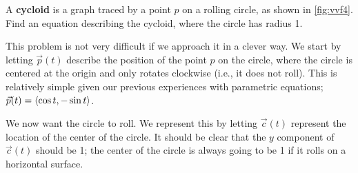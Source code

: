 \begin{example}\label{ex_vvf4}%
A \textbf{cycloid} is a graph traced by a point $p$ on a rolling circle, as shown in \autoref{fig:vvf4}. Find an equation describing the cycloid, where the circle has radius 1.
\begin{center}
\captionsetup{type=figure}
\caption{Tracing a cycloid.}\label{fig:vvf4}\tagstructend
\end{center}
\solution
This problem is not very difficult if we approach it in a clever way. We start by letting $\vec p(t)$ describe the position of the point $p$ on the circle, where the circle is centered at the origin and only rotates clockwise (i.e., it  does not roll). This is relatively simple given our previous experiences with parametric equations; $\vec p(t) =\left\langle \cos t, -\sin t\right\rangle$. 

We now want the circle to roll. We represent this by letting $\vec c(t)$ represent the location of the center of the circle. It should be clear that the $y$ component of $\vec c(t)$ should be 1; the center of the circle is always going to be 1 if it rolls on a horizontal surface.



\end{example}
